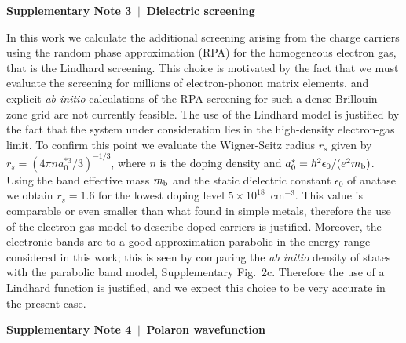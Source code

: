 \documentclass[12pt]{nature-mod}
\begin{document}
\vspace{0.5cm}
\textbf{Supplementary Note 3 $\,\bm|\,$ Dielectric screening} 

In this work we calculate the additional screening arising from the charge carriers
using the random phase approximation (RPA) for the homogeneous electron gas, that is
the Lindhard screening. This choice is motivated by the fact that we must evaluate
the screening for millions of electron-phonon matrix elements, and explicit
{\it ab initio} calculations of the RPA screening for such a dense Brillouin zone
grid are not currently feasible. The use of the Lindhard model is justified by the fact that
the system under consideration lies in the high-density electron-gas limit.
To confirm this point we evaluate the Wigner-Seitz radius $r_s$ given by
$r_s=(4\pi na_0^{\ast3}/3)^{-1/3}$, where $n$ is
the doping density and $a_0^\ast=\hbar^2\epsilon_0/(e^2 m_{\rm b})$\cite{Mahan}.
Using the band effective
mass $m_{\rm b}$ and the static dielectric constant $\epsilon_0$ of anatase we obtain
$r_s=1.6$ for
the lowest doping level $5\times10^{18}$~cm$^{-3}$. This value is comparable or even smaller 
than what found in simple metals, therefore the use of the electron gas model to describe
doped carriers is justified.
Moreover, the electronic bands are to a good approximation 
parabolic in the energy range considered in this work;
this is seen by comparing the {\it ab initio} density of states with the parabolic
band model, Supplementary Fig.~2c. Therefore the use of a Lindhard function is 
justified, and we expect this choice to be very accurate in the present case.

\vspace{0.5cm}
\textbf{Supplementary Note 4 $\,\bm|\,$ Polaron wavefunction} 
\end{document}
